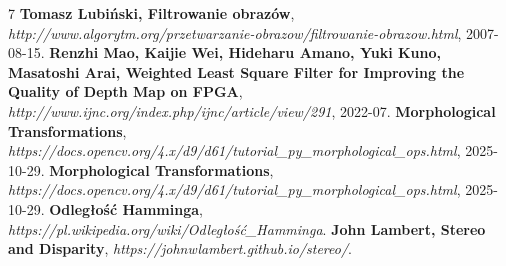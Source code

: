 \documentclass[magisterska]{pracadypl}
\begin{document}
\begin{thebibliography}{7}
 \textbf{Tomasz Lubiński, Filtrowanie obrazów}, \textit{http://www.algorytm.org/przetwarzanie-obrazow/filtrowanie-obrazow.html}, 2007-08-15.
 \textbf{Renzhi Mao, Kaijie Wei, Hideharu Amano, Yuki Kuno, Masatoshi Arai, Weighted Least Square Filter for Improving the Quality of Depth Map on FPGA}, \textit{http://www.ijnc.org/index.php/ijnc/article/view/291}, 2022-07.
 \textbf{Morphological Transformations}, \textit{https://docs.opencv.org/4.x/d9/d61/tutorial\_py\_morphological\_ops.html}, 2025-10-29.
 \textbf{Morphological Transformations}, \textit{https://docs.opencv.org/4.x/d9/d61/tutorial\_py\_morphological\_ops.html}, 2025-10-29.
 \textbf{Odległość Hamminga}, \textit{https://pl.wikipedia.org/wiki/Odległość\_Hamminga}.
 \textbf{John Lambert, Stereo and Disparity}, \textit{https://johnwlambert.github.io/stereo/}.

\end{thebibliography}
\end{document}
